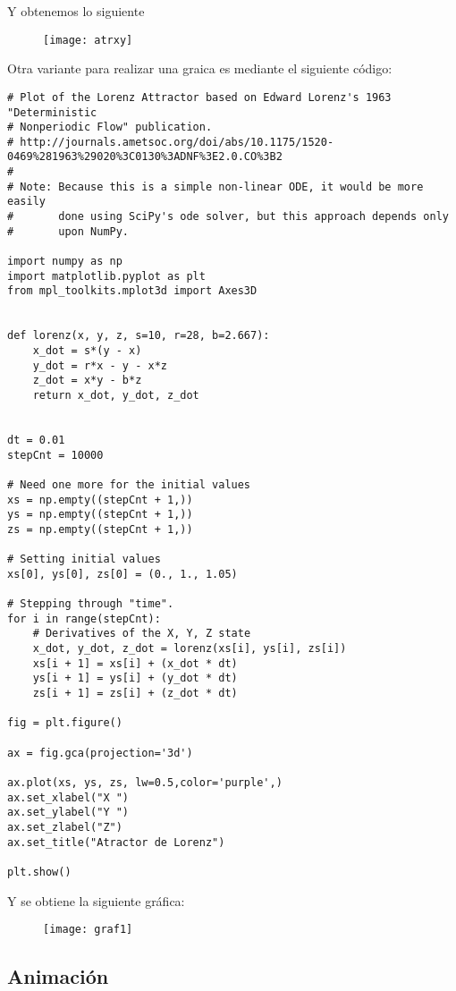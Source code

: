 \documentclass[12pt]{article}
\begin{document}
Y obtenemos lo siguiente 

\begin{figure}[ht]
\texttt{[image: atrxy]}
\centering
\end{figure}
\newpage 
Otra variante para realizar una graica es mediante el siguiente código:

\begin{verbatim}
# Plot of the Lorenz Attractor based on Edward Lorenz's 1963 "Deterministic
# Nonperiodic Flow" publication.
# http://journals.ametsoc.org/doi/abs/10.1175/1520-0469%281963%29020%3C0130%3ADNF%3E2.0.CO%3B2
#
# Note: Because this is a simple non-linear ODE, it would be more easily
#       done using SciPy's ode solver, but this approach depends only
#       upon NumPy.

import numpy as np
import matplotlib.pyplot as plt
from mpl_toolkits.mplot3d import Axes3D


def lorenz(x, y, z, s=10, r=28, b=2.667):
    x_dot = s*(y - x)
    y_dot = r*x - y - x*z
    z_dot = x*y - b*z
    return x_dot, y_dot, z_dot


dt = 0.01
stepCnt = 10000

# Need one more for the initial values
xs = np.empty((stepCnt + 1,))
ys = np.empty((stepCnt + 1,))
zs = np.empty((stepCnt + 1,))

# Setting initial values
xs[0], ys[0], zs[0] = (0., 1., 1.05)

# Stepping through "time".
for i in range(stepCnt):
    # Derivatives of the X, Y, Z state
    x_dot, y_dot, z_dot = lorenz(xs[i], ys[i], zs[i])
    xs[i + 1] = xs[i] + (x_dot * dt)
    ys[i + 1] = ys[i] + (y_dot * dt)
    zs[i + 1] = zs[i] + (z_dot * dt)

fig = plt.figure()

ax = fig.gca(projection='3d')

ax.plot(xs, ys, zs, lw=0.5,color='purple',)
ax.set_xlabel("X ")
ax.set_ylabel("Y ")
ax.set_zlabel("Z")
ax.set_title("Atractor de Lorenz")

plt.show()
\end{verbatim}
\newpage 
Y se obtiene la siguiente gráfica:

\begin{figure}[ht]
\texttt{[image: graf1]}
\centering
\end{figure}

\subsection*{Animación}
\end{document}
